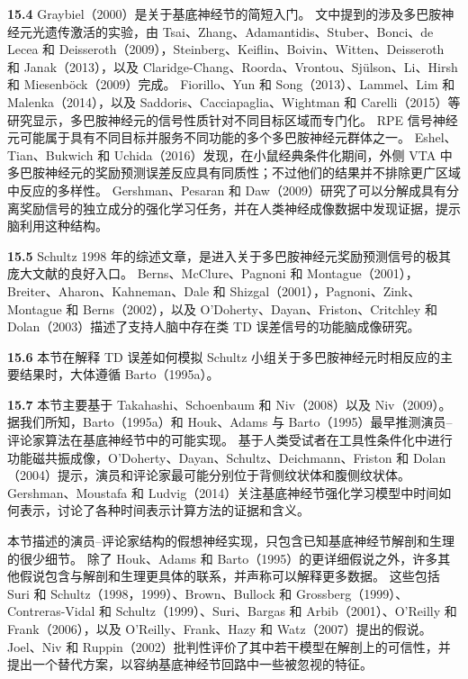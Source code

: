 \documentclass[UTF8, 12pt, fontset=fandol, oneside]{ctexart}
\begin{document}
\noindent\textbf{15.4}
Graybiel（2000）是关于基底神经节的简短入门。
文中提到的涉及多巴胺神经元光遗传激活的实验，由 Tsai、Zhang、Adamantidis、Stuber、Bonci、de Lecea 和 Deisseroth（2009），Steinberg、Keiflin、Boivin、Witten、Deisseroth 和 Janak（2013），以及 Claridge-Chang、Roorda、Vrontou、Sjülson、Li、Hirsh 和 Miesenböck（2009）完成。
Fiorillo、Yun 和 Song（2013）、Lammel、Lim 和 Malenka（2014），以及 Saddoris、Cacciapaglia、Wightman 和 Carelli（2015）等研究显示，多巴胺神经元的信号性质针对不同目标区域而专门化。
RPE 信号神经元可能属于具有不同目标并服务不同功能的多个多巴胺神经元群体之一。
Eshel、Tian、Bukwich 和 Uchida（2016）发现，在小鼠经典条件化期间，外侧 VTA 中多巴胺神经元的奖励预测误差反应具有同质性；不过他们的结果并不排除更广区域中反应的多样性。
Gershman、Pesaran 和 Daw（2009）研究了可以分解成具有分离奖励信号的独立成分的强化学习任务，并在人类神经成像数据中发现证据，提示脑利用这种结构。

\noindent\textbf{15.5}
Schultz 1998 年的综述文章，是进入关于多巴胺神经元奖励预测信号的极其庞大文献的良好入口。
Berns、McClure、Pagnoni 和 Montague（2001），Breiter、Aharon、Kahneman、Dale 和 Shizgal（2001），Pagnoni、Zink、Montague 和 Berns（2002），以及 O'Doherty、Dayan、Friston、Critchley 和 Dolan（2003）描述了支持人脑中存在类 TD 误差信号的功能脑成像研究。

\noindent\textbf{15.6}
本节在解释 TD 误差如何模拟 Schultz 小组关于多巴胺神经元时相反应的主要结果时，大体遵循 Barto（1995a）。

\noindent\textbf{15.7}
本节主要基于 Takahashi、Schoenbaum 和 Niv（2008）以及 Niv（2009）。
据我们所知，Barto（1995a）和 Houk、Adams 与 Barto（1995）最早推测演员--评论家算法在基底神经节中的可能实现。
基于人类受试者在工具性条件化中进行功能磁共振成像，O'Doherty、Dayan、Schultz、Deichmann、Friston 和 Dolan（2004）提示，演员和评论家最可能分别位于背侧纹状体和腹侧纹状体。
Gershman、Moustafa 和 Ludvig（2014）关注基底神经节强化学习模型中时间如何表示，讨论了各种时间表示计算方法的证据和含义。

本节描述的演员--评论家结构的假想神经实现，只包含已知基底神经节解剖和生理的很少细节。
除了 Houk、Adams 和 Barto（1995）的更详细假说之外，许多其他假说包含与解剖和生理更具体的联系，并声称可以解释更多数据。
这些包括 Suri 和 Schultz（1998，1999）、Brown、Bullock 和 Grossberg（1999）、Contreras-Vidal 和 Schultz（1999）、Suri、Bargas 和 Arbib（2001）、O'Reilly 和 Frank（2006），以及 O'Reilly、Frank、Hazy 和 Watz（2007）提出的假说。
Joel、Niv 和 Ruppin（2002）批判性评价了其中若干模型在解剖上的可信性，并提出一个替代方案，以容纳基底神经节回路中一些被忽视的特征。
\end{document}
